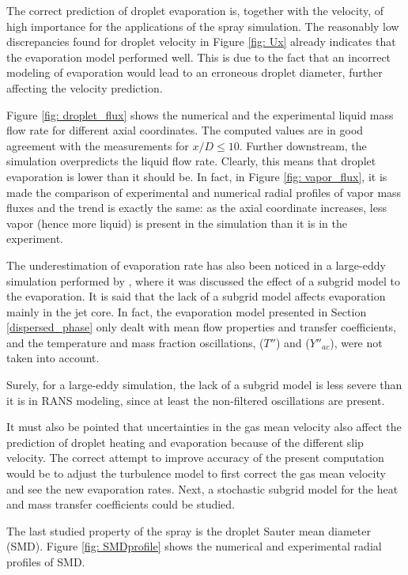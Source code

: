 \documentclass[preprint,12pt,review]{elsarticle}
\begin{document}
The correct prediction of droplet evaporation is, together with the velocity, of high importance for the applications of the spray simulation. The reasonably low discrepancies found for droplet velocity in Figure \ref{fig: Ux} already indicates that the evaporation model performed well. This is due to the fact that an incorrect modeling of evaporation would lead to an erroneous droplet diameter, further affecting the velocity prediction.

Figure \ref{fig: droplet_flux} shows the numerical and the experimental liquid mass flow rate for different axial coordinates. The computed values are in good agreement with the measurements for $x/D \le 10$. Further downstream, the simulation overpredicts the liquid flow rate. Clearly, this means that droplet evaporation is lower than it should be. In fact, in Figure \ref{fig: vapor_flux}, it is made the comparison of experimental and numerical radial profiles of vapor mass fluxes and the trend is exactly the same: as the axial coordinate increases, less vapor (hence more liquid) is present in the simulation than it is in the experiment.

The underestimation of evaporation rate has also been noticed in a large-eddy simulation performed by \citet{bini}, where it was discussed the effect of a subgrid model to the evaporation. It is said that the lack of a subgrid model affects evaporation mainly in the jet core. In fact, the evaporation model presented in Section \ref{dispersed_phase} only dealt with mean flow properties and transfer coefficients, and the temperature and mass fraction oscillations, ($T''$) and ($Y''_{ac}$), were not taken into account.

Surely, for a large-eddy simulation, the lack of a subgrid model is less severe than it is in RANS modeling, since at least the non-filtered oscillations are present. 

It must also be pointed that uncertainties in the gas mean velocity also affect the prediction of droplet heating and evaporation because of the different slip velocity. The correct attempt to improve accuracy of the present computation would be to adjust the turbulence model to first correct the gas mean velocity and see the new evaporation rates. Next, a stochastic subgrid model for the heat and mass transfer coefficients could be studied.

The last studied property of the spray is the droplet Sauter mean diameter (SMD). Figure \ref{fig: SMDprofile} shows the numerical and experimental radial profiles of SMD.
\end{document}
